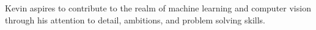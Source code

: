 

\vspace{-.2cm}
\begin{cvparagraph}

Kevin aspires to contribute to the realm of machine learning and computer vision through his attention to detail, ambitions, and problem solving skills.
\end{cvparagraph}
